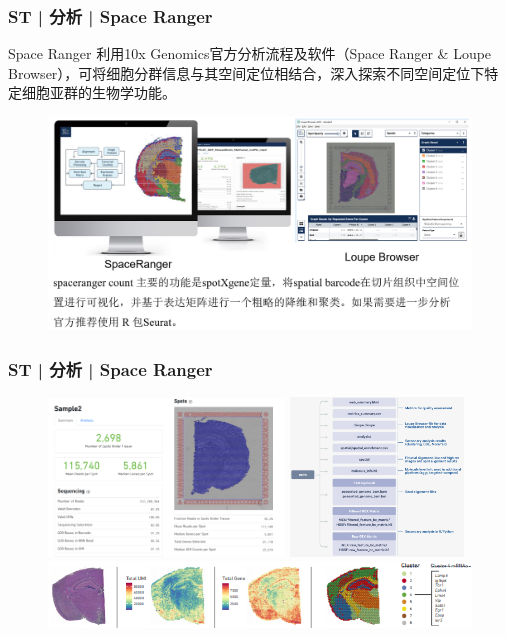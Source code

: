 \documentclass[11pt]{ctexbeamer}
\begin{document}
\begin{frame}
	\frametitle{ST | 分析 | Space Ranger}
	\begin{block}{Space Ranger}
	利用10x Genomics官方分析流程及软件（Space Ranger \& Loupe Browser），可将细胞分群信息与其空间定位相结合，深入探索不同空间定位下特定细胞亚群的生物学功能。
	\end{block}
    \begin{figure}
    	\includegraphics[width=\textwidth]{ST_spaceranger_02.png}
    \end{figure}
\end{frame}

\begin{frame}
	\frametitle{ST | 分析 | Space Ranger}
	\begin{figure}
		\includegraphics[width=0.56\textwidth]{ST_spaceranger_01.png}
		\includegraphics[width=0.41\textwidth]{ST_spaceranger_03.png}\\
		\vspace{0.5em}
		\includegraphics[width=\textwidth]{ST_spaceranger_05.png}
	\end{figure}
\end{frame}
\end{document}
